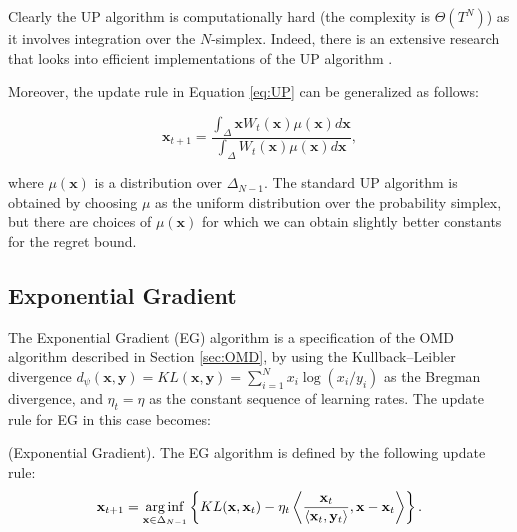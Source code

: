 Clearly the UP algorithm is computationally hard (the complexity is $\Theta(T^N)$) as it involves integration over the $N$-simplex. Indeed, there is an extensive research that looks into efficient implementations of the UP algorithm \cite{kalai2002efficient}.


Moreover, the update rule in Equation \eqref{eq:UP} can be generalized as follows:

\begin{equation}\label{eq:general_UP}
\mathbf x_{t+1}=\frac{\int_{\Delta}\mathbf x W_t(\mathbf x)\mu(\mathbf x)d\mathbf x}{\int_{\Delta} W_t(\mathbf x)\mu(\mathbf x)d\mathbf x},
\end{equation}

where $\mu(\mathbf x)$ is a distribution over $\Delta_{N-1}$. The standard UP algorithm is obtained by choosing $\mu$ as the uniform distribution over the probability simplex, but there are choices of $\mu(\mathbf x)$ for which we can obtain slightly better constants for the regret bound.




\subsection{Exponential Gradient}\label{sec:EG}

The Exponential Gradient (EG) algorithm is a specification of the OMD algorithm described in Section \ref{sec:OMD}, by using the Kullback–Leibler divergence $d_\psi(\mathbf x,\mathbf y)=KL(\mathbf x,\mathbf y)=\sum\limits_{i=1}^Nx_i\log(x_i/y_i)$ as the Bregman divergence, and $\eta_t=\eta$ as the constant sequence of learning rates. The update rule for EG in this case becomes:

\begin{definition}(Exponential Gradient). The EG algorithm is defined by the following update rule:
\begin{equation}\label{eq:update_EG}
\mathbf x_{t+1}=\operatorname*{arg\,inf}\limits_{\mathbf x\in\Delta_{N-1}} \left\{KL(\mathbf x,\mathbf x_t)-\eta_t\left\langle \frac{\mathbf x_t}{\langle \mathbf x_t,\mathbf y_t\rangle},\mathbf x-\mathbf x_t\right\rangle\right\}.
\end{equation}
\end{definition}

